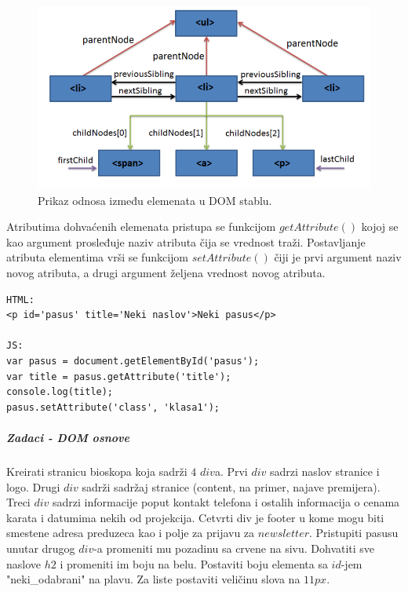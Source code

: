 \begin{figure}[h!]
\begin{center}
\includegraphics[scale=0.5]{pictures/parentchild.png}
\end{center}
\caption{Prikaz odnosa između elemenata u DOM stablu.}
\label{fig:dom2}
\end{figure}	
Atributima dohvaćenih elemenata pristupa se funkcijom $getAttribute()$ kojoj se kao argument prosleđuje naziv atributa čija se vrednost traži. Postavljanje atributa elementima vrši se funkcijom $setAttribute()$ čiji je prvi argument naziv novog atributa, a drugi argument željena vrednost novog atributa.
\begin{lstlisting}[backgroundcolor = \color{lightgray}, breaklines=true]
HTML:
<p id='pasus' title='Neki naslov'>Neki pasus</p>

JS:
var pasus = document.getElementById('pasus');
var title = pasus.getAttribute('title');
console.log(title);
pasus.setAttribute('class', 'klasa1');
\end{lstlisting}

\subparagraph{Zadaci - DOM osnove }
\begin{primer}
Kreirati stranicu bioskopa koja sadrži $4$ $div$a. Prvi $div$ sadrzi naslov stranice i logo. Drugi $div$ sadrži sadržaj stranice (content, na primer, najave premijera). Treci $div$ sadrzi informacije poput kontakt telefona i ostalih informacija o cenama karata i datumima nekih od projekcija. Cetvrti div je footer u kome mogu biti smestene adresa preduzeca kao i polje za prijavu za $newsletter$. Pristupiti pasusu unutar drugog $div$-a promeniti mu pozadinu sa crvene na sivu. Dohvatiti sve naslove $h2$ i promeniti im boju na belu. Postaviti boju elementa sa $id$-jem "neki\_odabrani" na plavu. Za liste postaviti veličinu slova na $11px$. 
\end{primer}

